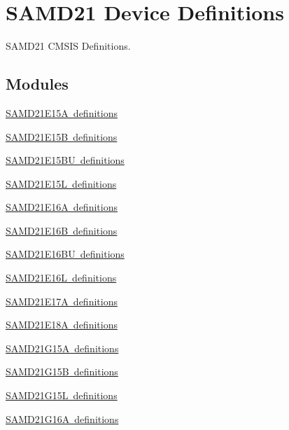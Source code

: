 \hypertarget{group___s_a_m_d21__definitions}{}\section{S\+A\+M\+D21 Device Definitions}
\label{group___s_a_m_d21__definitions}


S\+A\+M\+D21 C\+M\+S\+IS Definitions.  


\subsection*{Modules}
\begin{DoxyCompactItemize}
\item 
\mbox{\hyperlink{group___s_a_m_d21_e15_a__definitions}{S\+A\+M\+D21\+E15\+A definitions}}
\item 
\mbox{\hyperlink{group___s_a_m_d21_e15_b__definitions}{S\+A\+M\+D21\+E15\+B definitions}}
\item 
\mbox{\hyperlink{group___s_a_m_d21_e15_b_u__definitions}{S\+A\+M\+D21\+E15\+B\+U definitions}}
\item 
\mbox{\hyperlink{group___s_a_m_d21_e15_l__definitions}{S\+A\+M\+D21\+E15\+L definitions}}
\item 
\mbox{\hyperlink{group___s_a_m_d21_e16_a__definitions}{S\+A\+M\+D21\+E16\+A definitions}}
\item 
\mbox{\hyperlink{group___s_a_m_d21_e16_b__definitions}{S\+A\+M\+D21\+E16\+B definitions}}
\item 
\mbox{\hyperlink{group___s_a_m_d21_e16_b_u__definitions}{S\+A\+M\+D21\+E16\+B\+U definitions}}
\item 
\mbox{\hyperlink{group___s_a_m_d21_e16_l__definitions}{S\+A\+M\+D21\+E16\+L definitions}}
\item 
\mbox{\hyperlink{group___s_a_m_d21_e17_a__definitions}{S\+A\+M\+D21\+E17\+A definitions}}
\item 
\mbox{\hyperlink{group___s_a_m_d21_e18_a__definitions}{S\+A\+M\+D21\+E18\+A definitions}}
\item 
\mbox{\hyperlink{group___s_a_m_d21_g15_a__definitions}{S\+A\+M\+D21\+G15\+A definitions}}
\item 
\mbox{\hyperlink{group___s_a_m_d21_g15_b__definitions}{S\+A\+M\+D21\+G15\+B definitions}}
\item 
\mbox{\hyperlink{group___s_a_m_d21_g15_l__definitions}{S\+A\+M\+D21\+G15\+L definitions}}
\item 
\mbox{\hyperlink{group___s_a_m_d21_g16_a__definitions}{S\+A\+M\+D21\+G16\+A definitions}}

\end{DoxyCompactItemize}
